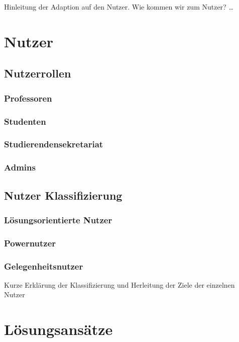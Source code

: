 Hinleitung der Adaption auf den Nutzer. Wie kommen wir zum Nutzer?
\dots




\chapter{Nutzer}

\section{Nutzerrollen}
\subsection{Professoren}
\subsection{Studenten}
\subsection{Studierendensekretariat}
\subsection{Admins}

\section{Nutzer Klassifizierung}

\subsection{Lösungsorientierte Nutzer}
\subsection{Powernutzer}
\subsection{Gelegenheitsnutzer}
Kurze Erklärung der Klassifizierung und Herleitung der Ziele der einzelnen Nutzer
\label{ch:Content1:sec:Section2}





\chapter{Lösungsansätze}

